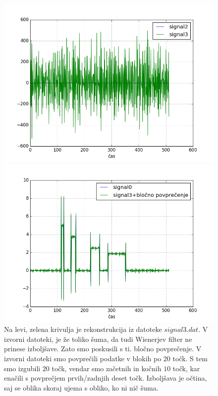 \documentclass[slovene,11pt,a4paper]{article}
\numberwithin{equation}{section} %
\numberwithin{figure}{section} %
\numberwithin{table}{section} %
\begin{document}
\begin{figure}[h]
\centering
\begin{minipage}{0.5\textwidth}
\centering
\includegraphics[scale=0.4]{slike/druga_delna_rezultati2.png}
\end{minipage}\hfill
\begin{minipage}{0.5\textwidth}
\centering
\includegraphics[scale=0.4]{slike/12_2_blocno_popvprecenje.png}
\end{minipage}
\caption{Na levi, zelena krivulja je rekonstrukcija iz datoteke $signal3.dat$. V izvorni datoteki, je že toliko šuma, da tudi Wienerjev filter ne prinese izboljšave. Zato smo poskusili s ti. bločno povprečenje. V izvorni datoteki smo povprečili podatke v blokih po $20$ točk. S tem smo izgubili $20$ točk, vendar smo začetnih in kočnih $10$ točk, kar enačili s povprečjem prvih/zadnjih deset točk. Izboljšava je očtina, saj se oblika skoraj ujema s obliko, ko ni nič šuma.}
\end{figure}
\end{document}
